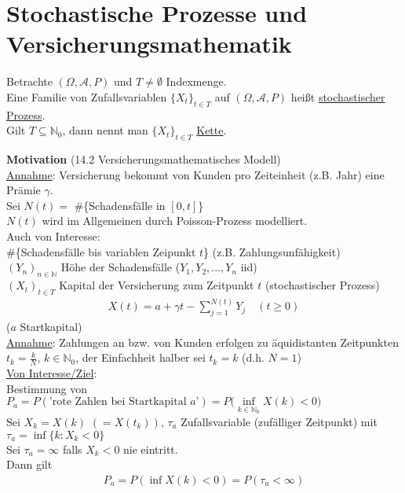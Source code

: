 \documentclass[a4paper,openany]{book}
\theoremstyle{mytheoremstyle}
\theoremstyle{mytheoremstyle2}
\begin{document}
\chapter{Stochastische Prozesse und Versicherungsmathematik}
\begin{defi}{14.1}{}
  Betrachte $(\Omega ,\mathcal{A},P)$ und $T \neq \emptyset $ Indexmenge.\\
  Eine Familie von Zufallsvariablen $\{X_t\}_{t \in T}$ auf $(\Omega ,\mathcal{A},P)$ heißt \underline{stochastischer Prozess}. \\
  Gilt $T \subseteq \mathbb{N}_0$, dann nennt man $\{X_t\}_{t \in T}$ \underline{Kette}.    
\end{defi}
\noindent \textbf{Motivation} (14.2 Versicherungsmathematisches Modell)\\
\underline{Annahme}: Versicherung bekommt von Kunden pro Zeiteinheit (z.B. Jahr) eine Prämie $\gamma $. \\
Sei $N(t)=$ \#\{Schadensfälle in $[0,t]$\} \\
$N(t)$ wird im Allgemeinen durch Poisson-Prozess modelliert.\\
Auch von Interesse:\\
\#\{Schadensfälle bis variablen Zeipunkt $t$\} %
(z.B. Zahlungsunfähigkeit) \\
$(Y_n)_{n \in \mathbb{N}}$ Höhe der Schadensfälle ($Y_1,Y_2,...,Y_n $ iid) \\
$(X_t)_{t \in T}$ Kapital der Versicherung zum Zeitpunkt $t$ (stochastischer Prozess)
\begin{align*}
  X(t)=a+\gamma t-\sum_{j=1}^{N(t)}{Y_j}\quad (t \geq 0)
\end{align*}
($a $ Startkapital)\\
\underline{Annahme}: Zahlungen an bzw. von Kunden erfolgen zu äquidistanten Zeitpunkten $t_k=\frac{k}{N}$, $k \in \mathbb{N}_0$, der Einfachheit halber sei $t_k=k$ (d.h. $N=1$) \\
\underline{Von Interesse/Ziel}: \\
Bestimmung von $P_a=P(\text{'rote Zahlen bei Startkapital $a$'})=P\bigg(\inf\limits _{k \in \mathbb{N}_0}X(k)<0\bigg)$ \\
Sei $X_k=X(k)$ $(=X(t_k))$, $\tau_a$ Zufallsvariable (zufälliger Zeitpunkt) mit $\tau_a=\inf\{k:X_k<0\}$ \\
Sei $\tau_a=\infty $ falls $X_k<0$ nie eintritt. \\
Dann gilt 
\begin{align*}
  P_a=P(\inf X(k)<0)=P(\tau_a< \infty )
\end{align*}
\end{document}
